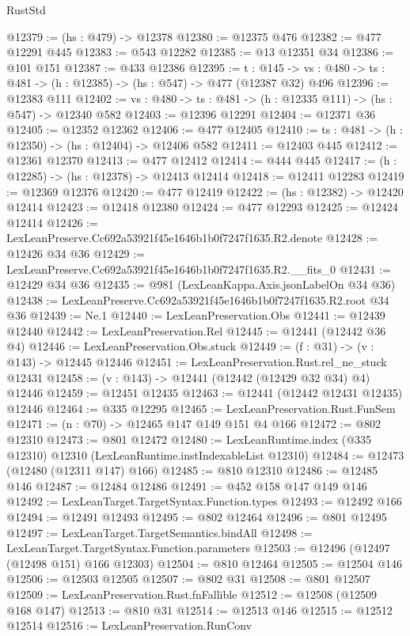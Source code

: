 \begin{lexlean}{RustStd}
\begin{coremodule}
@12379 := (hs : @479) -> @12378
@12380 := @12375 @476
@12382 := @477 @12291 @445
@12383 := @543 @12282
@12385 := @13 @12351 @34
@12386 := @101 @151
@12387 := @433 @12386
@12395 := {t : @145} ->
  {vs : @480} -> {ts : @481} -> (h : @12385) -> (hs : @547) -> @477 (@12387 @32) @496
@12396 := @12383 @111
@12402 := {vs : @480} -> {ts : @481} -> (h : @12335 @111) -> (hs : @547) -> @12340 @582
@12403 := @12396 @12291
@12404 := @12371 @36
@12405 := @12352 @12362
@12406 := @477 @12405
@12410 := {ts : @481} -> (h : @12350) -> (hs : @12404) -> @12406 @582
@12411 := @12403 @445
@12412 := @12361 @12370
@12413 := @477 @12412
@12414 := @444 @445
@12417 := (h : @12285) -> (hs : @12378) -> @12413 @12414
@12418 := @12411 @12283
@12419 := @12369 @12376
@12420 := @477 @12419
@12422 := (hs : @12382) -> @12420 @12414
@12423 := @12418 @12380
@12424 := @477 @12293
@12425 := @12424 @12414
@12426 := LexLeanPreserve.Cc692a53921f45e1646b1b0f7247f1635.R2.denote
@12428 := @12426 @34 @36
@12429 := LexLeanPreserve.Cc692a53921f45e1646b1b0f7247f1635.R2.__fits_0
@12431 := @12429 @34 @36
@12435 := @981 (LexLeanKappa.Axis.jsonLabelOn @34 @36)
@12438 := LexLeanPreserve.Cc692a53921f45e1646b1b0f7247f1635.R2.root @34 @36
@12439 := Ne.{1}
@12440 := LexLeanPreservation.Obs
@12441 := @12439 @12440
@12442 := LexLeanPreservation.Rel
@12445 := @12441 (@12442 @36 @4)
@12446 := LexLeanPreservation.Obs.stuck
@12449 := (f : @31) -> (v : @143) -> @12445 @12446
@12451 := LexLeanPreservation.Rust.rel_ne_stuck @12431
@12458 := (v : @143) -> @12441 (@12442 (@12429 @32 @34) @4) @12446
@12459 := @12451 @12435
@12463 := @12441 (@12442 @12431 @12435) @12446
@12464 := @335 @12295
@12465 := LexLeanPreservation.Rust.FunSem
@12471 := (n : @70) -> @12465 @147 @149 @151 @4 @166
@12472 := @802 @12310
@12473 := @801 @12472
@12480 := LexLeanRuntime.index (@335 @12310) @12310 (LexLeanRuntime.instIndexableList @12310)
@12484 := @12473 (@12480 (@12311 @147) @166)
@12485 := @810 @12310
@12486 := @12485 @146
@12487 := @12484 @12486
@12491 := @452 @158 @147 @149 @146
@12492 := LexLeanTarget.TargetSyntax.Function.types
@12493 := @12492 @166
@12494 := @12491 @12493
@12495 := @802 @12464
@12496 := @801 @12495
@12497 := LexLeanTarget.TargetSemantics.bindAll
@12498 := LexLeanTarget.TargetSyntax.Function.parameters
@12503 := @12496 (@12497 (@12498 @151) @166 @12303)
@12504 := @810 @12464
@12505 := @12504 @146
@12506 := @12503 @12505
@12507 := @802 @31
@12508 := @801 @12507
@12509 := LexLeanPreservation.Rust.fnFallible
@12512 := @12508 (@12509 @168 @147)
@12513 := @810 @31
@12514 := @12513 @146
@12515 := @12512 @12514
@12516 := LexLeanPreservation.RunConv

\end{coremodule}
\end{lexlean}
